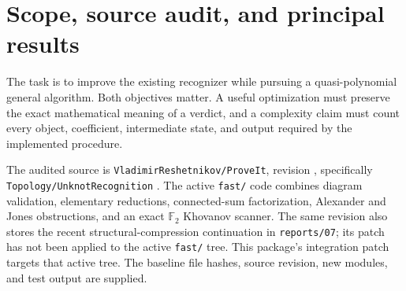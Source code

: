 \documentclass[11pt,letterpaper]{article}
\theoremstyle{definition}
\theoremstyle{remark}
\newcommand{\F}{\mathbb F_2}
\newcommand{\code}[1]{\texttt{#1}}
\begin{document}
\begin{abstract}
We continue the ProveIt unknot-recognition program with three concrete
algorithms and an explicit analysis of the remaining complexity gap.
First, we compute an exact prescribed interval of Khovanov homology by
discarding partial chain summands before allocation whenever the remaining
crossings cannot carry them into the target or its adjacent differential
degrees.  For a diagram with $n$ crossings, frontier size $w$, $s$ Seifert
circles, and minority crossing-sign count $\mu$, the delivered algorithm
computes normalized degrees $[-d,d]$ in
$2^{O(w+s+\mu+d)}(n+1)^{O(\mu+d+1)}$ bit operations.
This gives an $n^{O(\log n)}$ bound for those homological queries when
$w+s=O(\log^2 n)$ and $\mu+d=O(\log n)$.  A mismatching window is a
sound knot certificate; an agreeing window invokes the complete fallback.
Second, the positive-degree ideal of the matching category has nilpotence
exponent at most $w+1$, independently of object multiplicity.  Binary
matrix reduction followed by a finite perturbation series constructs an
exact minimal complex and explicit deformation-retraction maps.
Third, a known ball's trivalent boundary pattern is tested in
$O(s_P\log s_P)$ deterministic RAM operations by detecting dual loops,
bigons, and nonfacial triangles; negative results carry independently
verifiable primal-cut witnesses.
On the supplied 36-crossing stress input, the window reduces the peak
allocation from 17,694 to 7,692 objects and decides nontriviality under a
10,000-object ceiling that stops the full scanner.  The paper includes
paired measurements, proofs, integration code, an output-size obstruction
for expanded normal-surface cuts, and a prioritized research program.
\end{abstract}

\tableofcontents
\newpage
{}

\section{Scope, source audit, and principal results}
\label{sec:scope}

The task is to improve the existing recognizer while pursuing a
quasi-polynomial general algorithm.  Both objectives matter.  A useful
optimization must preserve the exact mathematical meaning of a verdict,
and a complexity claim must count every object, coefficient, intermediate
state, and output required by the implemented procedure.

The audited source is \code{VladimirReshetnikov/ProveIt}, revision
, specifically
\code{Topology/UnknotRecognition} \cite{proveit}.
The active \code{fast/} code combines diagram validation, elementary
reductions, connected-sum factorization, Alexander and Jones obstructions,
and an exact $\F$ Khovanov scanner.  The same revision also stores the
recent structural-compression continuation in \code{reports/07}; its
patch has not been applied to the active \code{fast/} tree.
This package's integration patch targets that active tree.  The baseline
file hashes, source revision, new modules, and test output are supplied.
\end{document}
